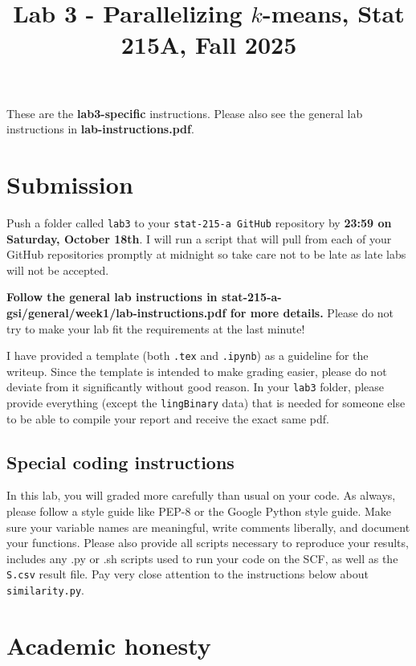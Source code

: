 \documentclass[letterpaper,12pt]{article}
\title{Lab 3 - Parallelizing $k$-means, Stat 215A, Fall 2025\vspace{-2em}}
\date{}
\begin{document}
\maketitle

These are the \textbf{lab3-specific} instructions. Please also see the general lab instructions in \textbf{lab-instructions.pdf}.

\tableofcontents

\section{Submission}
Push a folder called \texttt{lab3} to your \texttt{stat-215-a GitHub} repository by \textbf{23:59 on Saturday, October 18th}. I will run a script that will pull from each of your GitHub repositories promptly at midnight so take care not to be late as late labs will not be accepted.

\textbf{Follow the general lab instructions in stat-215-a-gsi/general/week1/lab-instructions.pdf for more details.} Please do not try to make your lab fit the requirements at the last minute!

I have provided a template (both \texttt{.tex} and \texttt{.ipynb}) as a guideline for the writeup. Since the template is intended to make grading easier, please do not deviate from it significantly without good reason. In your \texttt{lab3} folder, please provide everything (except the \texttt{lingBinary} data) that is needed for someone else to be able to compile your report and receive the exact same pdf.

\subsection{Special coding instructions}
In this lab, you will graded more carefully than usual on your code. As always, please follow a style guide like PEP-8 or the Google Python style guide. Make sure your variable names are meaningful, write comments liberally, and document your functions. Please also provide all scripts necessary to reproduce your results, includes any .py or .sh scripts used to run your code on the SCF, as well as the \texttt{S.csv} result file. Pay very close attention to the instructions below about \texttt{similarity.py}.

\section{Academic honesty}
\end{document}
